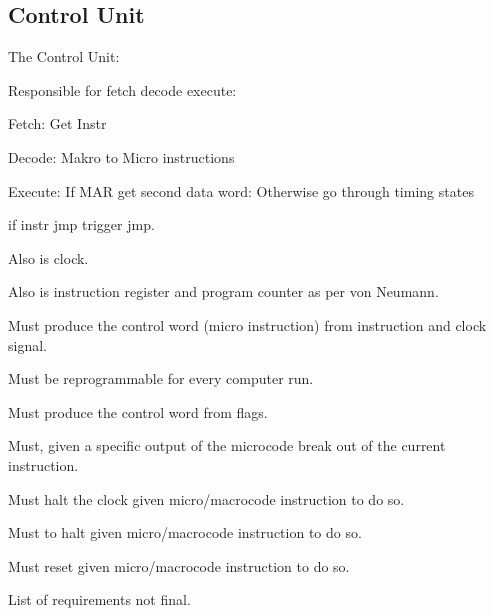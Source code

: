\subsection{Control Unit}

The Control Unit:

Responsible for fetch decode execute:  

Fetch: Get Instr

Decode: Makro to Micro instructions

Execute: If MAR get second data word: 
Otherwise go through timing states

if instr jmp trigger jmp. 

Also is clock. 

Also is instruction register and program counter as per von Neumann.



\begin{arch-requirement}
  Must produce the control word (micro instruction) from instruction and clock signal.
\end{arch-requirement}

\begin{arch-requirement}
  Must be reprogrammable for every computer run.
\end{arch-requirement}

\begin{turing-requirement}
  Must produce the control word from flags.
\end{turing-requirement}

\begin{feat-requirement}
  Must, given a specific output of the microcode break out of the current instruction. 
\end{feat-requirement}

\begin{feat-requirement}
  Must halt the clock given micro/macrocode instruction to do so. 
\end{feat-requirement}

\begin{feat-requirement}
  Must to halt given micro/macrocode instruction to do so. 
\end{feat-requirement}

\begin{feat-requirement}
  Must reset given micro/macrocode instruction to do so. 
\end{feat-requirement}

List of requirements not final.


